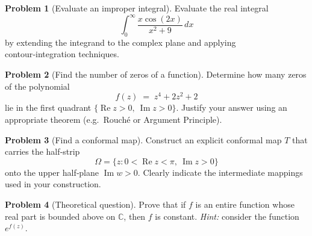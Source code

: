 \documentclass[12pt]{article}
\theoremstyle{definition}
\newtheorem{problem}{Problem}
\begin{document}
\pagebreak
\begin{problem}[Evaluate an improper integral]
Evaluate the real integral
\[
  \int_{0}^{\infty} \frac{x\cos(2x)}{x^{2}+9}\,dx
\]
by extending the integrand to the complex plane and applying contour‑integration techniques.
\end{problem}
\pagebreak
\begin{problem}[Find the number of zeros of a function]
Determine how many zeros of the polynomial
\[
  f(z)\;=\;z^{4}+2z^{2}+2
\]
lie in the first quadrant \(\{\operatorname{Re}z>0,\ \operatorname{Im}z>0\}\).
Justify your answer using an appropriate theorem (e.g.\ Rouché or Argument Principle).
\end{problem}
\pagebreak
\begin{problem}[Find a conformal map]
Construct an explicit conformal map \(T\) that carries the half‑strip
\[
  \Omega=\bigl\{z : 0<\operatorname{Re}z<\pi,\ \operatorname{Im}z>0\bigr\}
\]
onto the upper half‑plane \(\operatorname{Im}w>0\).  
Clearly indicate the intermediate mappings used in your construction.
\end{problem}
\pagebreak
\begin{problem}[Theoretical question]
Prove that if \(f\) is an entire function whose real part is bounded above on \(\mathbb{C}\), then \(f\) is constant.  
\emph{Hint:} consider the function \(e^{f(z)}\).
\end{problem}
\end{document}
